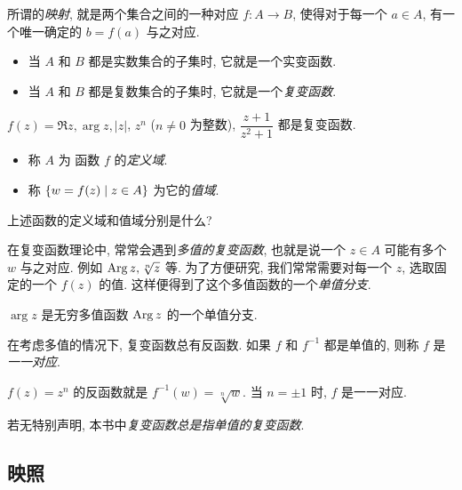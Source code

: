 所谓的\emph{映射}, 就是两个集合之间的一种对应 $f:A\to B$, 使得对于每一个 $a\in A$, 有一个唯一确定的 $b=f(a)$ 与之对应.
\begin{itemize}
  \item 当 $A$ 和 $B$ 都是实数集合的子集时, 它就是一个实变函数.
  \item 当 $A$ 和 $B$ 都是复数集合的子集时, 它就是一个\emph{复变函数}.
\end{itemize}

\begin{example}
  $f(z)=\Re z,\arg z,|z|$, $z^n$ ($n\neq0$ 为整数), $\dfrac{z+1}{z^2+1}$ 都是复变函数.
\end{example}

\begin{definition}
  \begin{itemize}
    \item 称 $A$ 为 函数 $f$ 的\emph{定义域}.
    \item 称 ${\left\{w=f(z)\mid z\in A\right\}}$ 为它的\emph{值域}.\footnotemark
  \end{itemize} 
\end{definition}
\begin{exercise}
  上述函数的定义域和值域分别是什么?
\end{exercise}

在复变函数理论中, 常常会遇到\emph{多值的复变函数}, 也就是说一个 $z\in A$ 可能有多个 $w$ 与之对应.
例如 $\operatorname{Arg} z,\sqrt[n]z$ 等.
为了方便研究, 我们常常需要对每一个 $z$, 选取固定的一个 $f(z)$ 的值.
这样便得到了这个多值函数的一个\emph{单值分支}.
\begin{example}
  $\arg z$ 是无穷多值函数 $\operatorname{Arg} z$ 的一个单值分支.
\end{example}

在考虑多值的情况下, 复变函数总有反函数.
如果 $f$ 和 $f^{-1}$ 都是单值的, 则称 $f$ 是\emph{一一对应}.
\begin{example}
  $f(z)=z^n$ 的反函数就是 $f^{-1}(w)=\sqrt[n]{w}$.
  {当 $n=\pm1$ 时, $f$ 是一一对应.}
\end{example}
若无特别声明, 本书中\emph{复变函数总是指单值的复变函数}.


\subsection{映照}

